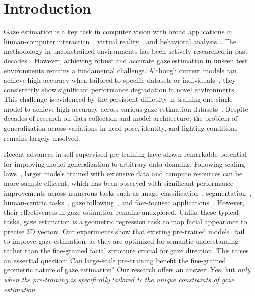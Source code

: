 \section{Introduction}
\label{sec:intro}

Gaze estimation is a key task in computer vision with broad applications in human-computer interaction~\cite{majaranta2014eye,belardinelli2024gaze}, virtual reality~\cite{lystbaek2022gaze}, and behavioral analysis~\cite{harezlak2018application,ke2024using,sharma2024review}. 
The methodology in unconstrained environments has been actively researched in past decades~\cite{baluja1993non,tan2002appearance,lu2012head,lu2014learning,zhang2015appearance,cheng2024appearance,ghosh2023automatic,wang2019generalizing}.
However, achieving robust and accurate gaze estimation in unseen test environments remains a fundamental challenge.
Although current models can achieve high accuracy when tailored to specific datasets or individuals~\cite{park2019few}, they consistently show significant performance degradation in novel environments. 
This challenge is evidenced by the persistent difficulty in training one single model to achieve high accuracy across various gaze estimation datasets~\cite{funes2014eyediap,mpii_zhang19_pami,krafka2016eye,kellnhofer2019gaze360,zhang2020eth}.
Despite decades of research on data collection and model architecture, the problem of generalization across variations in head pose, identity, and lighting conditions remains largely unsolved.




Recent advances in self-supervised pre-training have shown remarkable potential for improving model generalization to arbitrary data domains.
Following scaling laws~\cite{kaplan2020scaling}, larger models trained with extensive data and compute resources can be more sample-efficient, which has been observed with significant performance improvements across numerous tasks such as image classification~\cite{srivastava2024omnivec,singh2023effectiveness,fang2023eva}, segmentation~\cite{li2023dreamteacher,xiang2023denoising,zhao2023unleashing,kirillov2023segment}, human-centric tasks~\cite{khirodkar2025sapiens}, gaze following~\cite{lin2024gazehta}, and face-focused applications~\cite{zheng2022general,cai2023marlin,gao2024self,wang2023toward,sun2024face}.  
However, their effectiveness in gaze estimation remains unexplored.
Unlike these typical tasks, gaze estimation is a geometric regression task to map facial appearance to precise 3D vectors.
Our experiments show that existing pre-trained models~\cite{zheng2022general,caron2021emerging,chen2021empirical} fail to improve gaze estimation, as they are optimized for semantic understanding rather than the fine-grained facial structure crucial for gaze direction.
This raises an essential question: Can large-scale pre-training benefit the fine-grained geometric nature of gaze estimation? 
Our research offers an answer: Yes, but \textit{only when the pre-training is specifically tailored to the unique constraints of gaze estimation}.



